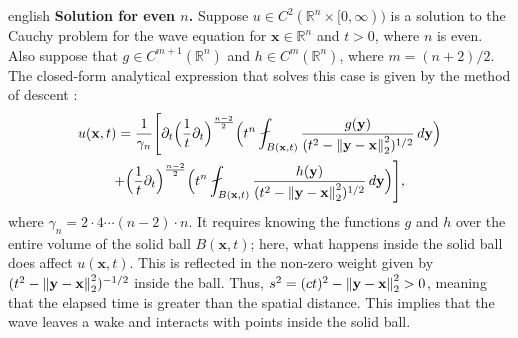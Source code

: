 \begin{hyphenrules}{english}
\textbf{Solution for even $n$.}
Suppose $u\in C^2(\mathbb{R}^n\times[0,\infty))$ is a solution to the Cauchy problem for the wave equation for
$\mathbf{x}\in\mathbb{R}^n$ and $t>0$, where $n$ is even. Also suppose that $g\in C^{m+1}(\mathbb{R}^n)$ and $h\in C^m(\mathbb{R}^n)$,
where $m=(n+2)/2$. The closed-form analytical expression that solves this case is given by the method
of descent \cite{evans2010}:
\begin{multline}
  u(\mathbf{x},t)=\frac{1}{\gamma_n}\Bigg[\partial_t\Big(\frac1t\partial_t\Big)^{\frac{n-2}{2}}
    \Big(t^{n}\fint_{B(\mathbf{x},t)}\frac{g(\mathbf{y})}{(t^2-\norm{\mathbf{y}-\mathbf{x}}_2^2)^{1/2}}\,d\mathbf{y}\Big)\\
    +\Big(\frac1t\partial_t\Big)^{\frac{n-2}{2}}
    \Big(t^{n}\fint_{B(\mathbf{x},t)}\frac{h(\mathbf{y})}{(t^2-\norm{\mathbf{y}-\mathbf{x}}_2^2)^{1/2}}\,d\mathbf{y}\Big)\Bigg],
  \label{eq:wave-even}
\end{multline}
where $\gamma_n=2\cdot4\cdots(n-2)\cdot n$. It requires knowing the functions $g$ and $h$ over the
entire volume of the solid ball $B(\mathbf{x},t)$; here, what happens inside the solid ball does affect
$u(\mathbf{x},t)$. This is reflected in the non-zero weight given by $(t^2-\left\lVert \mathbf{y}-\mathbf{x} \right\rVert_2^2)^{-1/2}$ inside the
ball. Thus, $s^2=(ct)^2-\left\lVert \mathbf{y}-\mathbf{x} \right\rVert_2^2>0$, meaning that the elapsed time is greater than the spatial
distance. This implies that the wave leaves a wake and interacts with points inside the solid ball.


\end{hyphenrules}
